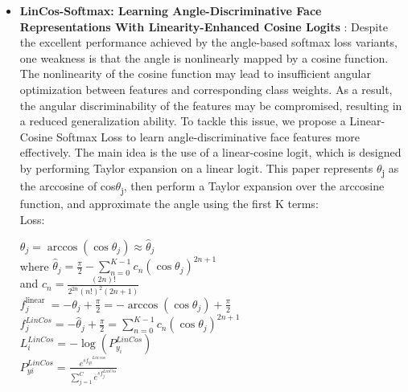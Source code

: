 \begin{itemize}
\begin{equation}
\begin{array}{ll}
1, & f\left(m, \theta_{\boldsymbol{w}_{y}, x}\right)-\cos \left(\theta_{\boldsymbol{w}_{k}, x}\right)<0
\end{array}\right.
\end{equation}
Loss:
\begin{equation}
\mathcal{L}_{5}=-\log \frac{e^{s f\left(m, \theta_{\boldsymbol{w}_{y}, \boldsymbol{x}}\right)}}{e^{s f\left(m, \theta_{\boldsymbol{w}_{y}, \boldsymbol{x}}\right)}+\sum_{k \neq y}^{K} h\left(t, \theta_{\boldsymbol{w}_{k}, \boldsymbol{x}}, I_{k}\right) e^{s \cos \left(\theta_{\boldsymbol{w}_{k}, \boldsymbol{x}}\right)}}
\end{equation}
	\item \textbf{LinCos-Softmax: Learning Angle-Discriminative Face Representations With Linearity-Enhanced Cosine Logits} : Despite the excellent performance achieved by the angle-based softmax loss variants, one weakness is that the angle is nonlinearly mapped by a cosine function. The nonlinearity of the cosine function may lead to insufficient angular optimization between features and corresponding class weights. As a result, the angular discriminability of the features may be compromised, resulting in a reduced generalization ability. 
To tackle this issue, we propose a Linear-Cosine Softmax Loss to learn angle-discriminative face features more effectively. The main idea is the use of a linear-cosine logit, which is designed by
performing Taylor expansion on a linear logit.
This paper represents $\theta$\textsubscript{j} as the arccosine of cos$\theta$\textsubscript{j}, then perform a Taylor expansion over the arccosine function, and approximate the angle using the first K terms:\\
Loss: 
\begin{center}
$\theta_{j}=\arccos \left(\cos \theta_{j}\right) \approx \hat{\theta}_{j}$ \\
where $\hat{\theta}_{j}=\frac{\pi}{2}-\sum_{n=0}^{K-1} c_{n}\left(\cos \theta_{j}\right)^{2 n+1}$ \\
and $c_{n}=\frac{(2 n) !}{2^{2 n}(n !)^{2}(2 n+1)}$ \\
$f_{j}^{\text {linear }}=-\theta_{j}+\frac{\pi}{2}=-\arccos \left(\cos \theta_{j}\right)+\frac{\pi}{2}$ \\
$f_{j}^{L i n C o s}=-\hat{\theta}_{j}+\frac{\pi}{2}=\sum_{n=0}^{K-1} c_{n}\left(\cos \theta_{j}\right)^{2 n+1}$ \\
$L_{i}^{L i n C o s}=-\log \left(P_{y_{i}}^{L i n C o s}\right)$\\
$P_{y i}^{L i n C o s}=\frac{e^{s f_{y i}}^{L i n \cos }}{\sum_{j=1}^{C} e^{s f_{j}^{L i n C o s}}}$
\end{center}

\end{itemize}
